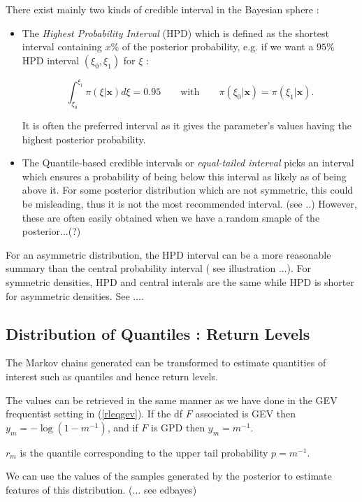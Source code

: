 There exist mainly two kinds of credible interval in the Bayesian sphere : 

\begin{itemize}
	\item The \emph{Highest Probability Interval} (HPD) which is defined as the shortest interval containing $x\%$ of the posterior probability, e.g. if we want a $95\%$ HPD interval $(\xi_0,\xi_1)$ for $\xi$ :
	
	\begin{equation} 
	\int_{\xi_0}^{\xi_1}\pi(\xi|\boldsymbol{x})d\xi=0.95 \qquad\text{with}\qquad \pi(\xi_0|\boldsymbol{x})=\pi(\xi_1|\boldsymbol{x}).
	\end{equation}
	
	It is often the preferred interval as it gives the parameter's values having the highest posterior probability. 
	\item The Quantile-based credible intervals or \emph{equal-tailed interval} picks an interval which ensures a probability of being below this interval as likely as of being above it. 
	For some posterior distribution which are not symmetric, this could be misleading, thus it is not the most recommended interval. (see ..)
	However, these are often easily obtained when we have a random smaple of the posterior...(?)
\end{itemize}
For an asymmetric distribution,
the HPD interval can be a more reasonable summary than the central probability
interval ( see illustration ...). For symmetric densities, HPD and central interals are the same while HPD is shorter for asymmetric densities.
See \citet{liu_simulation-efficient_2015}....

\subsection{Distribution of Quantiles : Return Levels}

The Markov chains generated can be transformed to estimate quantities of interest such as quantiles and hence return levels.

The values can be retrieved in the same manner as we have done in the GEV frequentist setting in (\ref{rleqgev}). If the df $F$ associated is GEV then $y_m = -\log(1-m^{-1})$, and if $F$ is GPD then $y_m=m^{-1}$.

$r_m$ is the quantile corresponding to the upper tail probability $p=m^{-1}$. 

We can use the values of the samples generated by the posterior to estimate features of this distribution. (... see edbayes)
 
 




